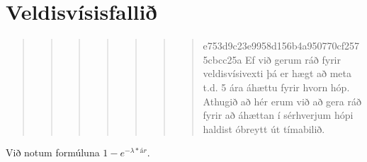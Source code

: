 \documentclass[
]{book}
\begin{document}
\hypertarget{veldisvuxedsisfalliuxf0-1}{%
\section{Veldisvísisfallið}\label{veldisvuxedsisfalliuxf0-1}}

\begin{quote}
\begin{quote}
\begin{quote}
\begin{quote}
\begin{quote}
\begin{quote}
\begin{quote}
e753d9c23e9958d156b4a950770cf2575cbcc25a
Ef við gerum ráð fyrir veldisvísivexti þá er hægt að meta t.d. 5 ára áhættu fyrir hvorn hóp. Athugið að hér erum við að gera ráð fyrir að áhættan í sérhverjum hópi haldist óbreytt út tímabilið.
\end{quote}
\end{quote}
\end{quote}
\end{quote}
\end{quote}
\end{quote}
\end{quote}

Við notum formúluna \(1-e^{-\lambda*ár}\).
\end{document}
